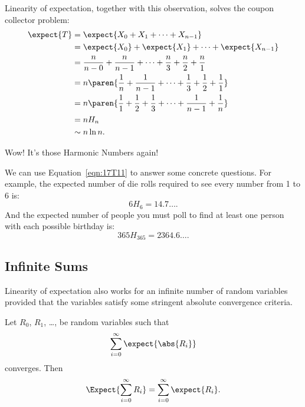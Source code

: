 Linearity of expectation, together with this observation, solves the
coupon collector problem:
%
\begingroup
\openup\jot
\begin{align}
\expect{T}
  & = \expect{X_0 + X_1 + \cdots + X_{n-1}} \notag\\
%
  & = \expect{X_0} + \expect{X_1} + \cdots + \expect{X_{n-1}} \notag\\
%
  & = \frac{n}{n - 0} + \frac{n}{n - 1} + \cdots + \frac{n}{3} +
    \frac{n}{2} + \frac{n}{1} \notag\\
%
  & = n \paren{\frac{1}{n} + \frac{1}{n-1} + \cdots + \frac{1}{3} +
  \frac{1}{2} + \frac{1}{1}} \notag\\
%
  &= n \paren{\frac{1}{1} + \frac{1}{2} + \frac{1}{3} + \cdots +
      \frac{1}{n-1} + \frac{1}{n}} \notag\\
%
  & = n H_n \label{eqn:17T11}\\
  & \sim n \ln n. \notag
\end{align}
\endgroup

Wow!  It's those Harmonic Numbers again!  

We can use Equation~\ref{eqn:17T11} to answer some concrete questions.
For example, the expected number of die rolls required to see every
number from 1 to 6 is:
%
\[
    6 H_6 = 14.7 \dots.
\]
%
And the expected number of people you must poll to find at least one
person with each possible birthday is:
%
\[
    365 H_{365} = 2364.6\dots.
\]


\subsection{Infinite Sums}

Linearity of expectation also works for an infinite number of random
variables provided that the variables satisfy some stringent absolute
convergence criteria.

\begin{theorem}\label{linexp}
Let $R_0$, $R_1$, \dots, be random variables such that
\[
\sum_{i = 0}^\infty \expect{\abs{R_i}}
\]
converges.  Then
\[
   \Expect{\sum_{i = 0}^\infty R_i} = \sum_{i = 0}^\infty \expect{R_i}.
\]
\end{theorem}

